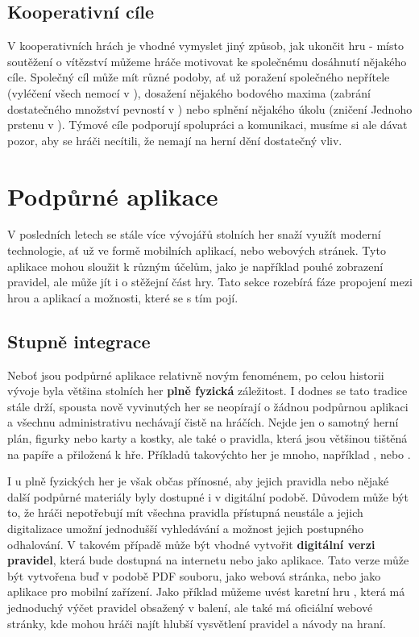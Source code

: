 \subsection{Kooperativní cíle}
\label{subsec:end_cooperative_goals}

V kooperativních hrách je vhodné vymyslet jiný způsob, jak ukončit hru - místo soutěžení o vítězství můžeme hráče motivovat ke společnému dosáhnutí nějakého cíle. Společný cíl může mít různé podoby, ať už poražení společného nepřítele (vyléčení všech nemocí v ), dosažení nějakého bodového maxima (zabrání dostatečného množství pevností v ) nebo splnění nějakého úkolu (zničení Jednoho prstenu v ). Týmové cíle podporují spolupráci a komunikaci, musíme si ale dávat pozor, aby se hráči necítili, že nemají na herní dění dostatečný vliv.


\section{Podpůrné aplikace}
\label{sec:apps}

V posledních letech se stále více vývojářů stolních her snaží využít moderní technologie, ať už ve formě mobilních aplikací, nebo webových stránek. Tyto aplikace mohou sloužit k různým účelům, jako je například pouhé zobrazení pravidel, ale může jít i o stěžejní část hry. Tato sekce rozebírá fáze propojení mezi hrou a aplikací a možnosti, které se s tím pojí. \cite{corvus_belli_2023}

\subsection{Stupně integrace}
\label{subsec:apps_app_integration}

Neboť jsou podpůrné aplikace relativně novým fenoménem, po celou historii vývoje byla většina stolních her \textbf{plně fyzická} záležitost. I dodnes se tato tradice stále drží, spousta nově vyvinutých her se neopírají o žádnou podpůrnou aplikaci a všechnu administrativu nechávají čistě na hráčích. Nejde jen o samotný herní plán, figurky nebo karty a kostky, ale také o pravidla, která jsou většinou tištěná na papíře a přiložená k hře. Příkladů takovýchto her je mnoho, například ,  nebo .

I u plně fyzických her je však občas přínosné, aby jejich pravidla nebo nějaké další podpůrné materiály byly dostupné i v digitální podobě. Důvodem může být to, že hráči nepotřebují mít všechna pravidla přístupná neustále a jejich digitalizace umožní jednodušší vyhledávání a možnost jejich postupného odhalování. V takovém případě může být vhodné vytvořit \textbf{digitální verzi pravidel}, která bude dostupná na internetu nebo jako aplikace. Tato verze může být vytvořena buď v podobě PDF souboru, jako webová stránka, nebo jako aplikace pro mobilní zařízení. Jako příklad můžeme uvést karetní hru , která má jednoduchý výčet pravidel obsažený v balení, ale také má oficiální webové stránky, kde mohou hráči najít hlubší vysvětlení pravidel a návody na hraní.

